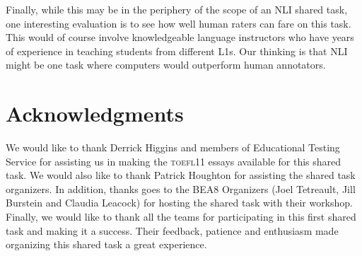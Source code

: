 \documentclass[11pt,letterpaper]{article}
\begin{document}
Finally, while this may be in the periphery of the scope of an
NLI shared task, one interesting evaluation is to see how well
human raters can fare on this task.  This would of course involve
knowledgeable language instructors who have years of experience
in teaching students from different L1s.  Our thinking is that NLI
might be one task where computers would outperform human annotators.

\section*{Acknowledgments}
We would like to thank Derrick Higgins and members of Educational
Testing Service for assisting us in making the \textsc{toefl11} essays
available for this shared task.  We would also like to thank
Patrick Houghton for assisting the shared task organizers.
In addition, thanks goes to the BEA8 Organizers (Joel Tetreault,
Jill Burstein and Claudia Leacock) for hosting the shared
task with their workshop.  Finally, we would like to thank all the teams for
participating in this first shared task and making it a success.
Their feedback, patience and enthusiasm made organizing this
shared task a great experience.








\appendix
\end{document}
